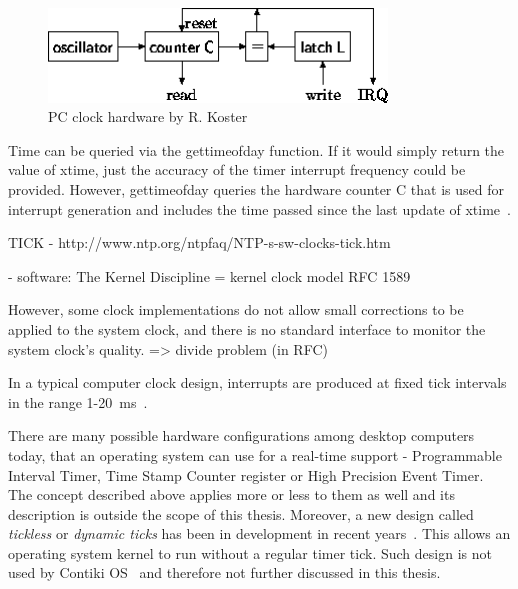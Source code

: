 \begin{figure}
  \centering
  \includegraphics[width=9cm,keepaspectratio]{fig/pc-clock.png}
  \caption{PC clock hardware by R. Koster}
  \label{fig:system-pc-clock}
\end{figure}

Time can be queried via the gettimeofday function.
If it would simply return the value of xtime,
just the accuracy of the timer interrupt frequency could be provided.
However, gettimeofday queries the hardware counter C that is used for
interrupt generation and includes the time passed since
the last update of xtime~\cite{thesis-beat}.


TICK - http://www.ntp.org/ntpfaq/NTP-s-sw-clocks-tick.htm


- software:
The Kernel Discipline =  kernel clock model RFC 1589

However, some clock implementations do not allow small corrections to be applied to the system clock, and there is no standard interface to monitor the system clock's quality.
=> divide problem (in RFC)

In a typical computer clock design, interrupts are produced at
fixed tick intervals in the range 1-20~ms~\cite{nanokernel}.

There are many possible hardware configurations among desktop computers today,
that an operating system can use for a real-time support -
Programmable Interval Timer,
Time Stamp Counter register or High Precision Event Timer.
The concept described above applies more or less to them as well
and its description is outside the scope of this thesis.
Moreover, a new design called {\it{tickless}} or {\it{dynamic ticks}}
has been in development in recent years~\cite{kernel-timer-systems}.
This allows an operating system kernel to run without a regular timer tick.
Such design is not used by Contiki OS~\cite{contiki-docs} and
therefore not further discussed in this thesis.

